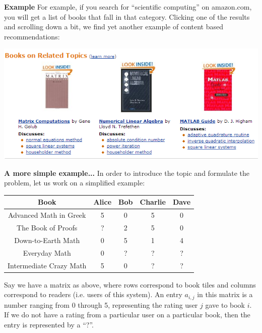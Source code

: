 \documentclass[xcolor=dvipsnames]{beamer}
\begin{document}
\begin{frame}
{\bf Example}
For example, if you search for ``scientific computing'' on amazon.com, you will get a list of books that fall in that category. \vfill\pause
Clicking one of the results and scrolling down a bit, we find yet another example of content based recommendations:

\begin{center}
\includegraphics[scale=.5]{cb.png}
\end{center}
\end{frame}

\begin{frame}
{\bf A more simple example...}
In order to introduce the topic and formulate the problem, let us work on a simplified example:

\begin{center}
\begin{tabular}{| c | c | c | c | c |}
\hline
Book & Alice & Bob & Charlie & Dave \\
\hline
Advanced Math in Greek & 5 & 0 & 5 & 0\\
\hline
The Book of Proofs & ? & 2 & 5 & 0\\
\hline
Down-to-Earth Math & 0 & 5 & 1 & 4\\
\hline
Everyday Math & 0 & ? & ? & ? \\
\hline
Intermediate Crazy Math & 5 & 0 & ? & ?\\
\hline
\end{tabular}
\end{center}
\end{frame}

\begin{frame}
Say we have a matrix as above, where rows correspond to book tiles and columns correspond to readers (i.e. users of this system). \vfill\pause An entry $a_{i,j}$ in this matrix is a number ranging from 0 through 5, representing the rating user $j$ gave to book $i$. \vfill\pause If we do not have a rating from a particular user on a particular book, then the entry is represented by a ``?''. \\
\end{frame}
\end{document}
